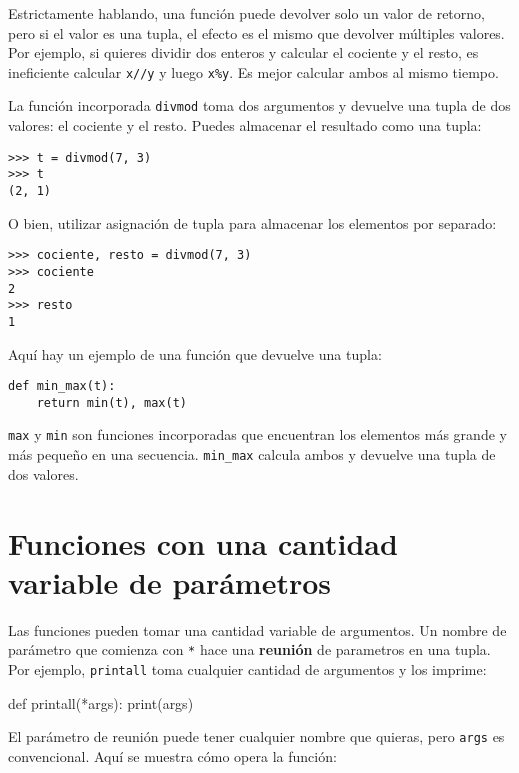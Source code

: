 Estrictamente hablando, una función puede devolver solo un valor de retorno, pero
si el valor es una tupla, el efecto es el mismo que devolver
múltiples valores.  Por ejemplo, si quieres dividir dos enteros
y calcular el cociente y el resto, es ineficiente
calcular \texttt{x//y} y luego \texttt{x\%y}.  Es mejor calcular
ambos al mismo tiempo.

La función incorporada \texttt{divmod} toma dos argumentos y
devuelve una tupla de dos valores: el cociente y el resto.
Puedes almacenar el resultado como una tupla:

\begin{Verbatim}[frame=single]
>>> t = divmod(7, 3)
>>> t
(2, 1)
\end{Verbatim}
%
O bien, utilizar asignación de tupla para almacenar los elementos por separado:

\begin{Verbatim}[frame=single]
>>> cociente, resto = divmod(7, 3)
>>> cociente
2
>>> resto
1
\end{Verbatim}
%
Aquí hay un ejemplo de una función que devuelve una tupla:

\begin{Verbatim}[frame=single]
def min_max(t):
    return min(t), max(t)
\end{Verbatim}
%
\texttt{max} y \texttt{min} son funciones incorporadas que encuentran
los elementos más grande y más pequeño en una secuencia.  \verb"min_max"
calcula ambos y devuelve una tupla de dos valores.

\section{Funciones con una cantidad variable de parámetros}
\label{gather}

Las funciones pueden tomar una cantidad variable de argumentos. Un nombre de parámetro
que comienza con \texttt{*} hace una \textbf{reunión} de parametros en
una tupla.  Por ejemplo, \texttt{printall}
toma cualquier cantidad de argumentos y los imprime:

\begin{python}[frame=single]
def printall(*args):
    print(args)
\end{python}
%
El parámetro de reunión puede tener cualquier nombre que quieras, pero \texttt{args} es
convencional.  Aquí se muestra cómo opera la función:

